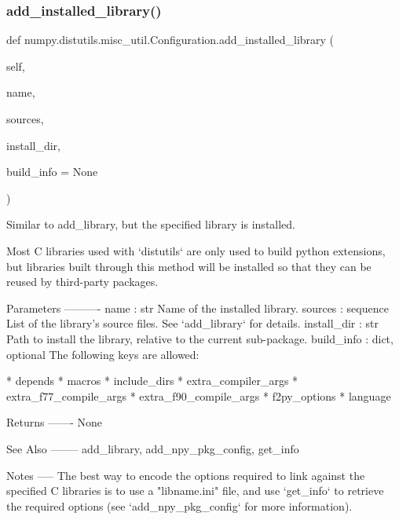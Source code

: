 \subsubsection{\texorpdfstring{add\+\_\+installed\+\_\+library()}{add\_installed\_library()}}
{\footnotesize\ttfamily def numpy.\+distutils.\+misc\+\_\+util.\+Configuration.\+add\+\_\+installed\+\_\+library (\begin{DoxyParamCaption}\item[{}]{self,  }\item[{}]{name,  }\item[{}]{sources,  }\item[{}]{install\+\_\+dir,  }\item[{}]{build\+\_\+info = {\ttfamily None} }\end{DoxyParamCaption})}

\begin{DoxyVerb}Similar to add_library, but the specified library is installed.

Most C libraries used with `distutils` are only used to build python
extensions, but libraries built through this method will be installed
so that they can be reused by third-party packages.

Parameters
----------
name : str
    Name of the installed library.
sources : sequence
    List of the library's source files. See `add_library` for details.
install_dir : str
    Path to install the library, relative to the current sub-package.
build_info : dict, optional
    The following keys are allowed:

* depends
* macros
* include_dirs
* extra_compiler_args
* extra_f77_compile_args
* extra_f90_compile_args
* f2py_options
* language

Returns
-------
None

See Also
--------
add_library, add_npy_pkg_config, get_info

Notes
-----
The best way to encode the options required to link against the specified
C libraries is to use a "libname.ini" file, and use `get_info` to
retrieve the required options (see `add_npy_pkg_config` for more
information).\end{DoxyVerb}
 \mbox{\label{classnumpy_1_1distutils_1_1misc__util_1_1Configuration_a2117c228c112b9eaedd553027ae6381f}} 
